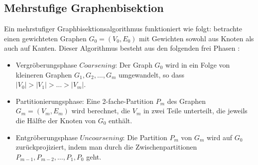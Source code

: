 \documentclass[runningheads]{llncs}
\begin{document}
\subsection{Mehrstufige Graphenbisektion}
Ein mehrstufiger Graphbisektionsalgorithmus funktioniert wie folgt: betrachte einen gewichteten Graphen $G_0 = (V_0, E_0)$ mit Gewichten sowohl aus Knoten als auch auf Kanten. Dieser Algorithmus besteht aus den folgenden frei Phasen \cite{karypis1998fast}:
\begin{itemize}
	\item Vergröberungsphase $Coarsening$: Der Graph $G_0$ wird in ein Folge von kleineren Graphen $G_1, G_2, \ldots, G_m$ umgewandelt, so dass $\lvert V_0 \lvert > \lvert V_1 \lvert > \ldots > \lvert V_m \lvert.$
	\item Partitionierungsphase: Eine 2-fache-Partition $P_m$ des Graphen $G_m = (V_m, E_m)$ wird berechnet, die $V_m$ in zwei Teile unterteilt, die jeweils die Hälfte der Knoten von $G_0$ enthält. 
	\item Entgröberungsphase $Uncoarsening$: Die Partition $P_m$ von $G_m$ wird auf $G_0$ zurückprojiziert, indem man durch die Zwischenpartitionen $P_{m-1}, P_{m-2}, \ldots, P_1, P_0$ geht.  
\end{itemize} 
\setcounter{secnumdepth}{3}
\end{document}
